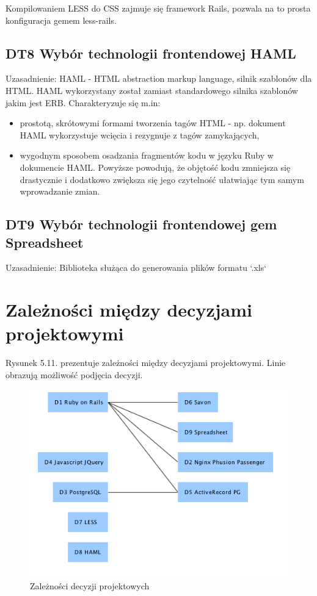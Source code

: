 Kompilowaniem LESS do CSS zajmuje się framework Rails, pozwala na to prosta konfiguracja gemem less-rails.

\subsection{DT8 Wybór technologii frontendowej HAML}

Uzasadnienie: HAML -  HTML abstraction markup language, silnik szablonów dla HTML. HAML wykorzystany został zamiast standardowego silnika szablonów jakim jest ERB. Charakteryzuje się m.in:

\begin{itemize}
\item prostotą, skrótowymi formami tworzenia tagów HTML - np. dokument HAML wykorzystuje wcięcia i rezygnuje z tagów zamykających,
\item wygodnym sposobem osadzania fragmentów kodu w języku Ruby w dokumencie HAML.
Powyższe powodują, że objętość kodu zmniejsza się drastycznie i dodatkowo zwiększa się jego czytelność ułatwiając tym samym wprowadzanie zmian.
\end{itemize}

\subsection{DT9 Wybór technologii frontendowej gem Spreadsheet}

Uzasadnienie: Biblioteka służąca do generowania plików formatu `.xls`

\section{Zależności między decyzjami projektowymi}

Rysunek 5.11. prezentuje zależności między decyzjami projektowymi. Linie obrazują możliwość podjęcia decyzji.

\begin{figure}[H] 
\centering\includegraphics[width=15cm]{figures/image12}
\caption{Zależności decyzji projektowych}\label{rys:use-case-diagram}
\end{figure}

